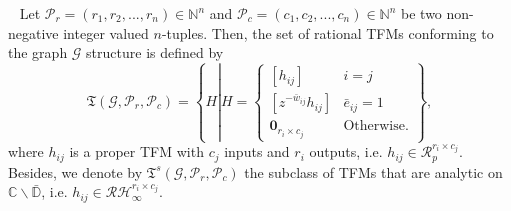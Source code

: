 \begin{defn}
\label{def:weak_strcuture}~\cite{naghnaeian2019youla}
Let $\mathcal{P}_r= \left( r_{1}, r_{2}, ..., r_{n}\right) \in \mathbb{N}^{n}$ and $\mathcal{P}_c = \left( c_{1}, c_{2}, ..., c_{n}\right) \in \mathbb{N}^{n}$ be two non-negative integer valued \(n\)-tuples. Then, the set of rational TFMs conforming to the graph \(\mathcal{G}\) structure is defined by
\begin{equation*}
\mathfrak{T}(\mathcal{G},\mathcal{P}_r,\mathcal{P}_c)
 = \left\{H \left\vert H = 
\begin{cases}
\left[h_{ij}\right] & i = j\\
\left[ z^{-\bar{w}_{ij}}h_{ij}\right] & \bar{e}_{ij} = 1\\
\mathbf{0}_{r_i \times c_j} & \text{Otherwise}.
\end{cases}\right.\right\},
\end{equation*}
where \({h}_{ij}\) is a proper TFM with \(c_{j}\) inputs and \(r_i\) outputs, i.e. \(h_{ij} \in \mathcal{R}_p^{r_i\times c_j}\).
Besides, we denote by \(\mathfrak{T}^s(\mathcal{G},\mathcal{P}_r,\mathcal{P}_c)\) the subclass of TFMs that are analytic on \(\mathbb{C} \backslash \bar{\mathbb{D}}\), i.e. \(h_{ij} \in \mathcal{RH}_\infty^{r_i\times c_j}\).
\end{defn}



